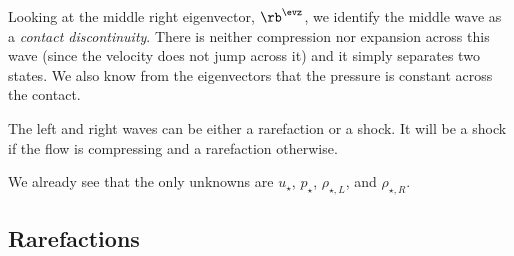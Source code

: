 Looking at the middle right eigenvector, $\rb^\evz$, we identify the
middle wave as a {\em contact discontinuity}.  There is neither
compression nor expansion across this wave (since the velocity does
not jump across it) and it simply separates two states.  We also know
from the eigenvectors that the pressure is constant across the
contact.

The left and right waves can be either a rarefaction or a shock.  It will
be a shock if the flow is compressing and a rarefaction otherwise.

We already see that the only unknowns are $u_\star$, $p_\star$, $\rho_{\star,L}$,
and $\rho_{\star,R}$.

\subsection{Rarefactions}


